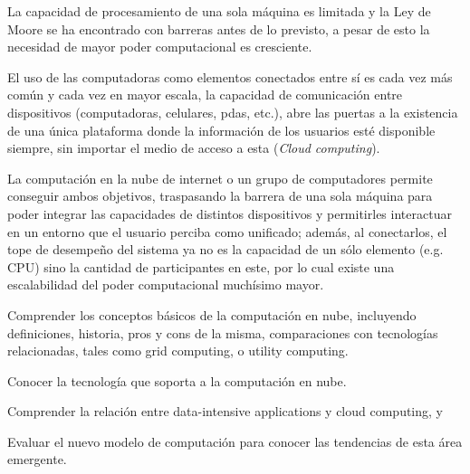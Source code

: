 \begin{syllabus}


\begin{justification}
La capacidad de procesamiento de una sola máquina es limitada y la Ley de Moore se ha encontrado 
con barreras antes de lo previsto, a pesar de esto la necesidad de mayor poder computacional es cresciente. 

El uso de las computadoras como elementos conectados entre sí­ es cada vez más común y cada vez en mayor escala, 
la capacidad de comunicación entre dispositivos (computadoras, celulares, pdas, etc.), abre las puertas 
a la existencia de una única plataforma donde la información de los usuarios
esté disponible siempre, sin importar el medio de acceso a esta (\textit{Cloud computing}).

La computación en la nube de internet o un grupo de computadores 
permite conseguir ambos objetivos, traspasando la barrera de una sola máquina para poder
integrar las capacidades de distintos dispositivos y permitirles interactuar en un entorno que
el usuario perciba como unificado; además, al conectarlos, el tope de desempeño
del sistema ya no es la capacidad de un sólo elemento (e.g. CPU) sino la cantidad de participantes en este,
por lo cual existe una escalabilidad del poder computacional muchísimo mayor.
\end{justification}

\begin{goals}
\item Comprender los conceptos básicos de la computación en nube, incluyendo definiciones, historia, pros y cons de la misma, comparaciones con tecnologías relacionadas, tales como grid computing, o utility computing.
\item Conocer la tecnología que soporta a la computación en nube.
\item Comprender la relación entre data-intensive applications y cloud computing, y
\item Evaluar el nuevo modelo de computación para conocer las tendencias de esta área emergente.
\end{goals}

\begin{outcomes}
\end{outcomes}


\end{syllabus}
